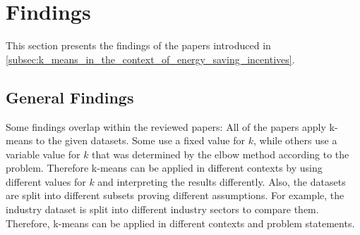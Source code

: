 \chapter{Findings}
\label{cha:findings}


This section presents the findings of the papers introduced in \autoref{subsec:k_means_in_the_context_of_energy_saving_incentives}.

\section{General Findings}
Some findings overlap within the reviewed papers:
All of the papers apply k-means to the given datasets.
Some use a fixed value for $k$, while others use a variable value for $k$ that was determined by the elbow method according to the problem.
Therefore k-means can be applied in different contexts by using different values for $k$ and interpreting the results differently.
Also, the datasets are split into different subsets proving different assumptions.
For example, the industry dataset is split into different industry sectors to compare them.
Therefore, k-means can be applied in different contexts and problem statements.


